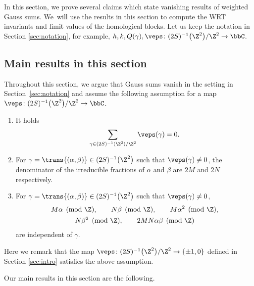 In this section, we prove several claims which state vanishing results of weighted Gauss sums.
We~will use the results in this section to compute the WRT invariants and limit values of the homological blocks.
Let us keep the notation in Section \ref{sec:notation}, for example, $ h, k, Q(\gamma), \veps \colon (2S)^{-1}\big(\Z^2\big)/\allowbreak\Z^2 \to \bbC $.


\subsection{Main results in this section} %

Throughout this section, we argue that Gauss sums vanish in the setting in Section~\ref{sec:notation} and assume the following assumption for a map $ \veps \colon (2S)^{-1}\big(\Z^2\big)/\Z^2 \to \bbC $.

\begin{assump}\qquad \label{assump:Gauss_sum}
	\begin{enumerate}
		\item[$(i)$] %
		It holds
		\begin{gather*}
		\sum_{\gamma \in (2S)^{-1}(\Z^2)/\Z^2} \veps(\gamma) = 0.
		\end{gather*}
		\item[$(ii)$] %
		For $ \gamma = \trans{(\alpha, \beta)} \in (2S)^{-1}\big(\Z^2\big) $ such that $ \veps(\gamma) \neq 0 $, the denominator of the irreducible fractions of $ \alpha $ and $ \beta $ are $ 2M $ and $ 2N $ respectively.
		\item[$(iii)$] %
		For $ \gamma = \trans{(\alpha, \beta)} \in (2S)^{-1}\big(\Z^2\big) $ such that $ \veps(\gamma) \neq 0 $,
		\begin{gather*}
		M\alpha \pmod \Z, \qquad
		N\beta \pmod \Z, \qquad
		M\alpha^2 \pmod \Z,
\\
		N\beta^2 \pmod \Z, \qquad
		2MN\alpha \beta \pmod \Z
		\end{gather*}
		are independent of $ \gamma $.
	\end{enumerate}
\end{assump}

Here we remark that the map $ \veps \colon (2S)^{-1}\big(\Z^2\big)/\Z^2 \to \{ \pm1, 0 \} $ defined in Section \ref{sec:intro} satisfies the above assumption.

Our main results in this section are the following.

